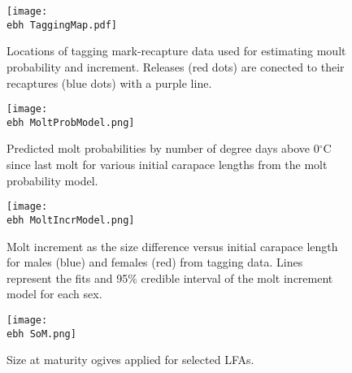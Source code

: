 \documentclass[11pt]{article}
\newcommand{\ebh}{/SpinDr/backup/bio_data/bio.lobster/figures/LFA2733Framework2018/} %
\begin{document}
    \begin{figure}
    \centering
        \texttt{[image: \\ebh TaggingMap.pdf]}
        \caption{Locations of tagging mark-recapture data used for estimating moult probability and increment. Releases (red dots) are conected to their recaptures (blue dots) with a purple line.}

    \end{figure}

    \begin{figure}
    \centering
        \texttt{[image: \\ebh MoltProbModel.png]}
        \caption{Predicted molt probabilities by number of degree days above 0$^{\circ}$C since last molt for various initial carapace lengths from the molt probability model.}

    \end{figure}

    \begin{figure}
    \centering
        \texttt{[image: \\ebh MoltIncrModel.png]}
        \caption{Molt increment as the size difference versus initial carapace length for males (blue) and females (red) from tagging data. Lines represent the fits and 95\% credible interval of the molt increment model for each sex.}

    \end{figure}    


    \begin{figure}
    \centering
        \texttt{[image: \\ebh SoM.png]}
        \caption{Size at maturity ogives applied for selected LFAs.}

    \end{figure}    

  



    
\end{document}
